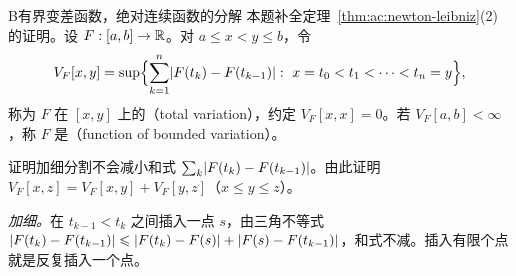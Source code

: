 \begin{probleme}{B}{有界变差函数，绝对连续函数的分解}
本题补全定理~\ref{thm:ac:newton-leibniz}(2) 的证明。设 $F:[a,b]\to\mathbb{R}$。对 $a\leqslant x<y\leqslant b$，令
\[
V_F[x,y]=\sup\Bigl\{\sum_{k=1}^n\abs{F(t_k)-F(t_{k-1})}:\ x=t_0<t_1<\cdots<t_n=y\Bigr\},
\]
称为 $F$ 在 $[x,y]$ 上的（total variation），约定 $V_F[x,x]=0$。若 $V_F[a,b]<\infty$，称 $F$ 是（function of bounded variation）。
\begin{questions}
\item 证明加细分割不会减小和式 $\sum_k\lvert F(t_k)-F(t_{k-1})\rvert$。由此证明 $V_F[x,z]=V_F[x,y]+V_F[y,z]$（$x\leqslant y\leqslant z$）。
\begin{solution}
\emph{加细。}在 $t_{k-1}<t_k$ 之间插入一点 $s$，由三角不等式 $\lvert F(t_k)-F(t_{k-1})\rvert\leqslant\lvert F(t_k)-F(s)\rvert+\lvert F(s)-F(t_{k-1})\rvert$，和式不减。插入有限个点就是反复插入一个点。


\end{solution}
\end{questions}
\end{probleme}
